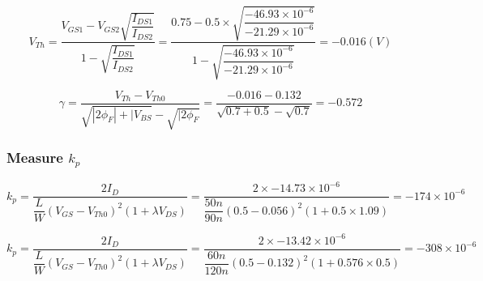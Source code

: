 \[ V_{Th} = \dfrac{V_{GS1} - V_{GS2}\sqrt{\dfrac{I_{DS1}}{I_{DS2}}}}{1 - \sqrt{\dfrac{I_{DS1}}{I_{DS2}}}} = \dfrac{0.75 - 0.5\times \sqrt{\dfrac{-46.93\times 10^{-6}}{-21.29\times 10^{-6}}}}{1 - \sqrt{\dfrac{-46.93\times 10^{-6}}{-21.29\times 10^{-6}}}} = -0.016(V)\] 

\[ \gamma = \dfrac{V_{Th} - V_{Th0}}{\sqrt{|2\phi_{F}| + |V_{BS} } - \sqrt{|2\phi_{F}}} = \dfrac{-0.016 - 0.132}{\sqrt{0.7 + 0.5} - \sqrt{0.7}} = -0.572 \]

\subsubsection{Measure $k_p$}


\[ k_p = \dfrac{2I_{D}}{\dfrac{L}{W} (V_{GS} - V_{Th0})^{2} (1 + \lambda V_{DS})} = \dfrac{2\times -14.73 \times 10^{-6}}{\dfrac{50n}{90n} (0.5 - 0.056)^{2} (1 + 0.5 \times 1.09)} = -174 \times 10^{-6}\]


\[ k_p = \dfrac{2I_{D}}{\dfrac{L}{W} (V_{GS} - V_{Th0})^{2} (1 + \lambda V_{DS})} = \dfrac{2\times -13.42 \times 10^{-6}}{\dfrac{60n}{120n} (0.5 - 0.132)^{2} (1 + 0.576 \times 0.5)} = -308 \times 10^{-6}\]


